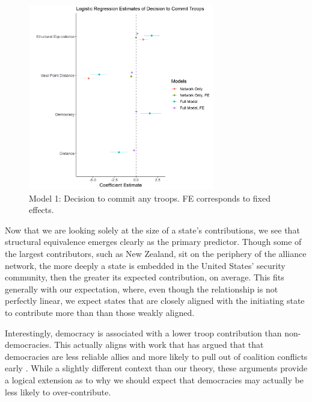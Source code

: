 \documentclass[12pt,letterpaper]{article}
\begin{document}
	\begin{figure}[H]
		\centering
		\includegraphics[width=0.725\textwidth]{logit_coef.png}
		\caption{Model 1: Decision to commit any troops. FE corresponds to fixed effects.}
		\label{fig:logit_reg}
	\end{figure}
	
	Now that we are looking solely at the size of a state's contributions, we see that structural equivalence emerges clearly as the primary predictor. Though some of the largest contributors, such as New Zealand, sit on the periphery of the alliance network, the more deeply a state is embedded in the United States' security community, then the greater its expected contribution, on average. This fits generally with our expectation, where, even though the relationship is not perfectly linear, we expect states that are closely aligned with the initiating state to contribute more than than those weakly aligned.

	Interestingly, democracy is associated with a lower troop contribution than non-democracies. This actually aligns with work that has argued that that democracies are less reliable allies and more likely to pull out of coalition conflicts early \citep{massie_whydemocraticallies_2016, gartzke_whydemocraciesmay_2004}. While a slightly different context than our theory, these arguments provide a logical extension as to why we should expect that democracies may actually be less likely to over-contribute.
	
\end{document}
